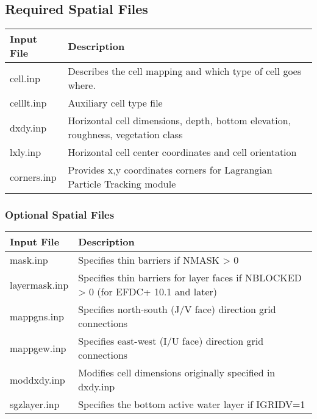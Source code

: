 \documentclass[letterpaper,10pt,english]{sphinxmanual}
\begin{document}
\subsection{Required Spatial Files}
\label{\detokenize{inputfiles/spatial/index:required-spatial-files}}\label{\detokenize{inputfiles/spatial/index:spatial}}\label{\detokenize{inputfiles/spatial/index::doc}}

\begin{savenotes}\sphinxattablestart
\centering
\begin{tabulary}{\linewidth}[t]{|T|T|}
\hline
\sphinxstyletheadfamily 
Input File
&\sphinxstyletheadfamily 
Description
\\
\hline
cell.inp
&
Describes the cell mapping and which type of cell goes where.
\\
\hline
celllt.inp
&
Auxiliary cell type file
\\
\hline
dxdy.inp
&
Horizontal cell dimensions, depth, bottom elevation, roughness, vegetation class
\\
\hline
lxly.inp
&
Horizontal cell center coordinates and cell orientation
\\
\hline
corners.inp
&
Provides x,y coordinates corners for Lagrangian Particle Tracking module
\\
\hline
\end{tabulary}
\par
\sphinxattableend\end{savenotes}


\subsubsection{Optional Spatial Files}
\label{\detokenize{inputfiles/spatial/index:optional-spatial-files}}

\begin{savenotes}\sphinxattablestart
\centering
\begin{tabulary}{\linewidth}[t]{|T|T|}
\hline
\sphinxstyletheadfamily 
Input File
&\sphinxstyletheadfamily 
Description
\\
\hline
mask.inp
&
Specifies thin barriers if NMASK \textgreater{} 0
\\
\hline
layermask.inp
&
Specifies thin barriers for layer faces if NBLOCKED \textgreater{} 0  (for EFDC+ 10.1 and later)
\\
\hline
mappgns.inp
&
Specifies north-south (J/V face) direction grid connections
\\
\hline
mappgew.inp
&
Specifies east-west (I/U face) direction grid connections
\\
\hline
moddxdy.inp
&
Modifies cell dimensions originally specified in dxdy.inp
\\
\hline
sgzlayer.inp
&
Specifies the bottom active water layer if IGRIDV=1
\\
\hline
\end{tabulary}
\par
\sphinxattableend\end{savenotes}
\end{document}
